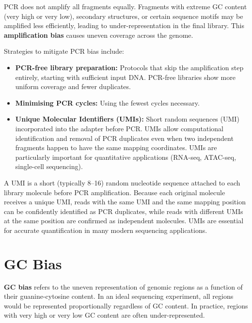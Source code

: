 PCR does not amplify all fragments equally. Fragments with extreme GC content (very high or very low), secondary structures, or certain sequence motifs may be amplified less efficiently, leading to under-representation in the final library. This \textbf{amplification bias} causes uneven coverage across the genome.

Strategies to mitigate PCR bias include:
\begin{itemize}[itemsep=2pt]
  \item \textbf{PCR-free library preparation:} Protocols that skip the amplification step entirely, starting with sufficient input DNA. PCR-free libraries show more uniform coverage and fewer duplicates.
  \item \textbf{Minimising PCR cycles:} Using the fewest cycles necessary.
  \item \textbf{Unique Molecular Identifiers (UMIs):} Short random sequences (\acrfull{UMI}) incorporated into the adapter before PCR. UMIs allow computational identification and removal of PCR duplicates even when two independent fragments happen to have the same mapping coordinates. UMIs are particularly important for quantitative applications (RNA-seq, ATAC-seq, single-cell sequencing).
\end{itemize}

\begin{keyconcept}[title={UMIs: Molecular Barcodes for Deduplication}]
A \acrshort{UMI} is a short (typically 8--16\basepair{}) random nucleotide sequence attached to each library molecule before PCR amplification. Because each original molecule receives a unique UMI, reads with the same UMI and the same mapping position can be confidently identified as PCR duplicates, while reads with different UMIs at the same position are confirmed as independent molecules. UMIs are essential for accurate quantification in many modern sequencing applications.
\end{keyconcept}


\section{GC Bias}
\label{sec:seqprinciples:gc-bias}

\textbf{GC bias} refers to the uneven representation of genomic regions as a function of their guanine-cytosine content. In an ideal sequencing experiment, all regions would be represented proportionally regardless of GC content. In practice, regions with very high or very low GC content are often under-represented.

